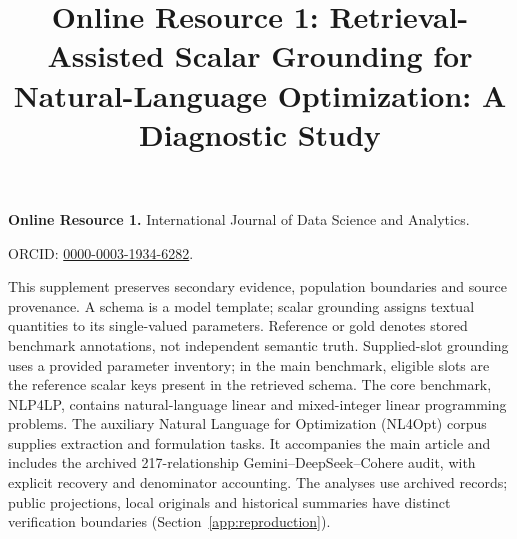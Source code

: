 \documentclass[pdflatex,sn-basic,Numbered]{sn-jnl}
\begin{document}
\title[Online Resource 1: Scalar Grounding]{Online Resource 1: Retrieval-Assisted Scalar Grounding for Natural-Language Optimization: A Diagnostic Study}
\author*[1]{ }
\maketitle
\renewcommand{\thesection}{S\arabic{section}}
\renewcommand{\thetable}{S\arabic{table}}
\renewcommand{\thefigure}{S\arabic{figure}}
\renewcommand{\theequation}{S\arabic{equation}}
\noindent\textbf{Online Resource 1.} International Journal of Data Science and Analytics.\par
\noindent ORCID: \href{https://orcid.org/0000-0003-1934-6282}{0000-0003-1934-6282}.\par

This supplement preserves secondary evidence, population boundaries and source provenance. A schema is a model template; scalar grounding assigns textual quantities to its single-valued parameters. Reference or gold denotes stored benchmark annotations, not independent semantic truth. Supplied-slot grounding uses a provided parameter inventory; in the main benchmark, eligible slots are the reference scalar keys present in the retrieved schema. The core benchmark, NLP4LP, contains natural-language linear and mixed-integer linear programming problems. The auxiliary Natural Language for Optimization (NL4Opt) corpus supplies extraction and formulation tasks. It accompanies the main article and includes the archived 217-relationship Gemini--DeepSeek--Cohere audit, with explicit recovery and denominator accounting. The analyses use archived records; public projections, local originals and historical summaries have distinct verification boundaries (Section~\ref{app:reproduction}).
\makeatletter
\renewcommand*\l@section[2]{\@dottedtocline{1}{0em}{2.5em}{\bfseries #1}{#2}}
\renewcommand*\l@subsection{\@dottedtocline{2}{1.5em}{3.5em}}
\makeatother
\setcounter{tocdepth}{2}
\tableofcontents
\clearpage
\end{document}
